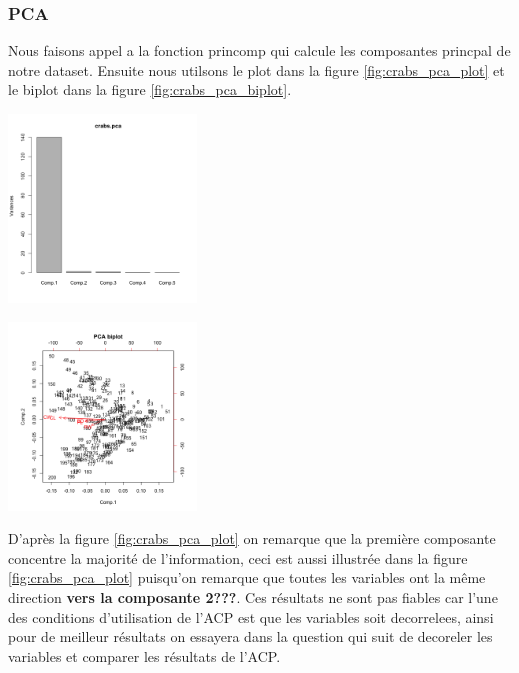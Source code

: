 \documentclass[]{report}
\begin{document}
\subsubsection{PCA}
Nous faisons appel a la fonction princomp qui calcule les composantes princpal de notre dataset. Ensuite nous utilsons le plot dans la figure \ref{fig:crabs_pca_plot} et le biplot dans la figure \ref{fig:crabs_pca_biplot}.\\
	\begin{minipage}{.5\textwidth}
		\centering
		\includegraphics[width=50mm]{Figures/Crabs/pca_plot.png}
		\label{fig:crabs_pca_plot}
	\end{minipage}%
	\hspace{0.08\linewidth}
	\begin{minipage}{.5\textwidth}
		\centering
		\includegraphics[width=50mm]{Figures/Crabs/pca_biplot.png}
		\label{fig:crabs_pca_biplot}
	\end{minipage}
D'après la figure \ref{fig:crabs_pca_plot} on remarque que la première composante concentre la majorité de l'information, ceci est aussi illustrée dans la figure \ref{fig:crabs_pca_plot} puisqu'on remarque que toutes les variables ont la même direction \textbf{vers la composante 2???}. Ces résultats ne sont pas fiables car l'une des conditions d'utilisation de l'ACP est que les variables soit decorrelees, ainsi pour de meilleur résultats on essayera dans la question qui suit de decoreler les variables et comparer les résultats de l'ACP.
\end{document}
